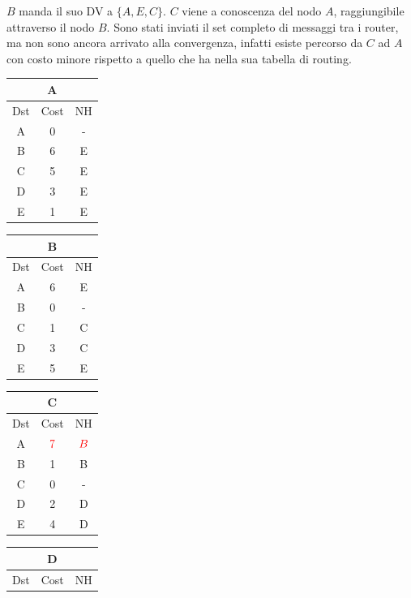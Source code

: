 \documentclass[10pt]{article}
\begin{document}
	\newline \newline
	$B$ manda il suo DV a $\{A,E,C\}$.
	\newline
	$C$ viene a conoscenza del nodo $A$, raggiungibile attraverso il nodo $B$.
	\newline
	Sono stati inviati il set completo di messaggi tra i router, ma non sono ancora arrivato alla convergenza, infatti esiste percorso da $C$ ad $A$ con costo minore rispetto a quello che ha nella sua tabella di routing.
	\begin{table}[h!]
		\begin{tabular}{|c||c||c|}
 			\hline
	 		\multicolumn{3}{|c|}{A} \\
 			\hline
 			Dst & Cost & NH\\
 			\hline
 			A & 0 & - \\
 			B & 6 & E \\
 			C & 5 & E  \\
 			D & 3 & E \\
 			E & 1 & E \\
 			\hline
		\end{tabular}
		\begin{tabular}{|c||c||c|}
 			\hline
	 		\multicolumn{3}{|c|}{B} \\
 			\hline
 			Dst & Cost & NH\\
 			\hline
 			A & 6 & E \\
 			B & 0 & - \\
 			C & 1 & C  \\
 			D & 3 & C \\
 			E & 5 & E \\
 			\hline
		\end{tabular}
		\begin{tabular}{|c||c||c|}
 			\hline
	 		\multicolumn{3}{|c|}{C} \\
 			\hline
 			Dst & Cost & NH\\
 			\hline
 			A & $\color{red} 7$ & $\color{red} B$ \\
 			B & 1 & B \\
 			C & 0 & - \\
 			D & 2 & D \\
 			E & 4 & D \\
 			\hline
		\end{tabular}
		\begin{tabular}{|c||c||c|}
 			\hline
	 		\multicolumn{3}{|c|}{D} \\
 			\hline
 			Dst & Cost & NH\\

\end{tabular}
\end{table}
\end{document}
